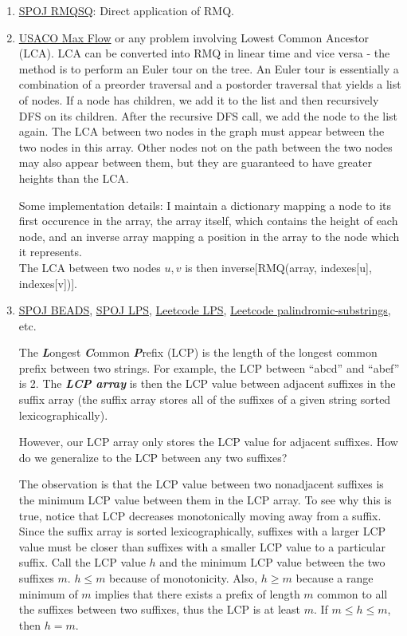 \documentclass[11pt, oneside]{article}
\newcommand{\emphasis}[1]{\textbf{\textit{#1}}}
\begin{document}
\begin{enumerate}
  \item \href{https://www.spoj.com/problems/RMQSQ/}{SPOJ RMQSQ}: Direct application of RMQ.

  \item \href{http://www.usaco.org/index.php?page=viewproblem2&cpid=576}{USACO Max Flow}
  or any problem involving Lowest Common Ancestor (LCA).
  LCA can be converted into RMQ in linear time and vice versa - the method is to
  perform an Euler tour on the tree. An Euler tour is essentially a combination of a
  preorder traversal and a postorder traversal that yields a list of nodes.
  If a node has children, we add it to the list and then recursively
  DFS on its children. After the recursive DFS call, we add the node to the list again.
  The LCA between two nodes in the graph must appear between the two nodes in this array.
  Other nodes not on the path between the two nodes may also appear between them,
  but they are guaranteed to have greater heights than the LCA.

  Some implementation details: I maintain a dictionary mapping a node to its first
  occurence in the array, the array itself, which contains the height of each node,
  and an inverse array mapping a position in the array to the node which it represents. \\
  The LCA between two nodes \( u, v \) is then inverse[RMQ(array, indexes[u], indexes[v])].

  \item \href{https://www.spoj.com/problems/BEADS/}{SPOJ BEADS}, \href{https://www.spoj.com/problems/LPS/}{SPOJ LPS},
  \href{https://leetcode.com/problems/longest-palindromic-substring/}{Leetcode LPS}, \href{https://leetcode.com/problems/palindromic-substrings/}{Leetcode palindromic-substrings}, etc.

  The \emphasis{L}ongest \emphasis{C}ommon \emphasis{P}refix (LCP) is
  the length of the longest common prefix between two strings.
  For example, the LCP between ``abcd'' and ``abef'' is 2.
  The \emphasis{LCP array} is then the LCP value between adjacent suffixes in the suffix array
  (the suffix array stores all of the suffixes of a given string sorted lexicographically).

  However, our LCP array only stores the LCP value for adjacent suffixes.
  How do we generalize to the LCP between any two suffixes?

  The observation is that the LCP value between two nonadjacent suffixes
  is the minimum LCP value between them in the LCP array.
  To see why this is true, notice that LCP decreases monotonically moving away from a suffix.
  Since the suffix array is sorted lexicographically, suffixes with a larger LCP
  value must be closer than suffixes with a smaller LCP value to a particular suffix.
  Call the LCP value \( h \) and the minimum LCP value between the two suffixes \( m \).
  \( h \leq m \) because of monotonicity.
  Also, \( h \geq m \) because a range minimum of \( m \) implies that there exists a prefix of length \( m \)
  common to all the suffixes between two suffixes, thus the LCP is at least \( m \).
  If \( m \leq h \leq m \), then \( h = m \).


\end{enumerate}
\end{document}
